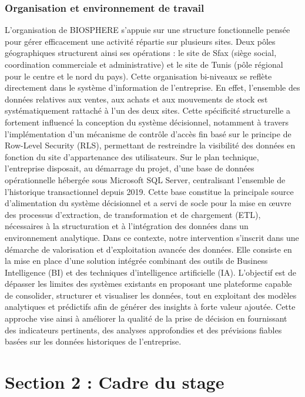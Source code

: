 \subsubsection{Organisation et environnement de travail}
L’organisation de BIOSPHERE s’appuie sur une structure fonctionnelle pensée pour gérer efficacement une activité répartie sur plusieurs sites. Deux pôles géographiques structurent ainsi ses opérations : le site de Sfax (siège social, coordination commerciale et administrative) et le site de Tunis (pôle régional pour le centre et le nord du pays). Cette organisation bi-niveaux se reflète directement dans le système d’information de l’entreprise. En effet, l’ensemble des données relatives aux ventes, aux achats et aux mouvements de stock est systématiquement rattaché à l’un des deux sites. Cette spécificité structurelle a fortement influencé la conception du système décisionnel, notamment à travers l’implémentation d’un mécanisme de contrôle d’accès fin basé sur le principe de Row-Level Security (RLS), permettant de restreindre la visibilité des données en fonction du site d’appartenance des utilisateurs.
Sur le plan technique, l’entreprise disposait, au démarrage du projet, d’une base de données opérationnelle hébergée sous Microsoft SQL Server, centralisant l’ensemble de l’historique transactionnel depuis 2019. Cette base constitue la principale source d’alimentation du système décisionnel et a servi de socle pour la mise en œuvre des processus d’extraction, de transformation et de chargement (ETL), nécessaires à la structuration et à l’intégration des données dans un environnement analytique.
Dans ce contexte, notre intervention s’inscrit dans une démarche de valorisation et d’exploitation avancée des données. Elle consiste en la mise en place d’une solution intégrée combinant des outils de Business Intelligence (BI) et des techniques d’intelligence artificielle (IA). L’objectif est de dépasser les limites des systèmes existants en proposant une plateforme capable de consolider, structurer et visualiser les données, tout en exploitant des modèles analytiques et prédictifs afin de générer des insights à forte valeur ajoutée. Cette approche vise ainsi à améliorer la qualité de la prise de décision en fournissant des indicateurs pertinents, des analyses approfondies et des prévisions fiables basées sur les données historiques de l’entreprise.


\section{Section 2 : Cadre du stage}
